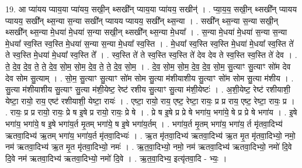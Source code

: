 \documentclass[17pt]{extarticle}
\begin{document}
19. आ प्या॑यय प्याय॒या प्या॑यय॒ सखी॒न् थ्सखी᳚न् प्याय॒या प्या॑यय॒ सखीन्॑ । . प्या॒य॒य॒ सखी॒न् थ्सखी᳚न् प्यायय प्यायय॒ सखी᳚न् थ्स॒न्या स॒न्या सखी᳚न् प्यायय प्यायय॒ सखी᳚न् थ्स॒न्या । . सखी᳚न् थ्स॒न्या स॒न्या सखी॒न् थ्सखी᳚न् थ्स॒न्या मे॒धया॑ मे॒धया॑ स॒न्या सखी॒न् थ्सखी᳚न् थ्स॒न्या मे॒धया᳚ । . स॒न्या मे॒धया॑ मे॒धया॑ स॒न्या स॒न्या मे॒धया᳚ स्व॒स्ति स्व॒स्ति मे॒धया॑ स॒न्या स॒न्या मे॒धया᳚ स्व॒स्ति । . मे॒धया᳚ स्व॒स्ति स्व॒स्ति मे॒धया॑ मे॒धया᳚ स्व॒स्ति ते॑ ते स्व॒स्ति मे॒धया॑ मे॒धया᳚ स्व॒स्ति ते᳚ । . स्व॒स्ति ते॑ ते स्व॒स्ति स्व॒स्ति ते॑ देव देव ते स्व॒स्ति स्व॒स्ति ते॑ देव । . ते॒ दे॒व॒ दे॒व॒ ते॒ ते॒ दे॒व॒ सो॒म॒ सो॒म॒ दे॒व॒ ते॒ ते॒ दे॒व॒ सो॒म॒ । . दे॒व॒ सो॒म॒ सो॒म॒ दे॒व॒ दे॒व॒ सो॒म॒ सु॒त्याꣳ सु॒त्याꣳ सो॑म देव देव सोम सु॒त्याम् । . सो॒म॒ सु॒त्याꣳ सु॒त्याꣳ सो॑म सोम सु॒त्या म॑शीयाशीय सु॒त्याꣳ सो॑म सोम सु॒त्या म॑शीय । . सु॒त्या म॑शीयाशीय सु॒त्याꣳ सु॒त्या म॑शी॒येष्ट॒ रेष्ट॑ रशीय सु॒त्याꣳ सु॒त्या म॑शी॒येष्टः॑ । . अ॒शी॒येष्ट॒ रेष्ट॑ रशीयाशी॒ येष्टा॒ रायो॒ राय॒ एष्ट॑ रशीयाशी॒ येष्टा॒ रायः॑ । . एष्टा॒ रायो॒ राय॒ एष्ट॒ रेष्टा॒ रायः॒ प्र प्र राय॒ एष्ट॒ रेष्टा॒ रायः॒ प्र । . रायः॒ प्र प्र रायो॒ रायः॒ प्रे ष इ॒षे प्र रायो॒ रायः॒ प्रे षे । . प्रे ष इ॒षे प्र प्रे षे भगा॑य॒ भगा॑ये॒ षे प्र प्रे षे भगा॑य । . इ॒षे भगा॑य॒ भगा॑ये॒ ष इ॒षे भगा॑य॒र्त मृ॒तम् भगा॑ये॒ ष इ॒षे भगा॑य॒र्तम् । . भगा॑य॒र्त मृ॒तम् भगा॑य॒ भगा॑य॒ र्त मृ॑तवा॒दिभ्य॑ ऋतवा॒दिभ्य॑ ऋ॒तम् भगा॑य॒ भगा॑य॒र्त मृ॑तवा॒दिभ्यः॑ । . ऋ॒त मृ॑तवा॒दिभ्य॑ ऋतवा॒दिभ्य॑ ऋ॒त मृ॒त मृ॑तवा॒दिभ्यो॒ नमो॒ नम॑ ऋतवा॒दिभ्य॑ ऋ॒त मृ॒त मृ॑तवा॒दिभ्यो॒ नमः॑ । . ऋ॒त॒वा॒दिभ्यो॒ नमो॒ नम॑ ऋतवा॒दिभ्य॑ ऋतवा॒दिभ्यो॒ नमो॑ दि॒वे दि॒वे नम॑ ऋतवा॒दिभ्य॑ ऋतवा॒दिभ्यो॒ नमो॑ दि॒वे । . ऋ॒त॒वा॒दिभ्य॒ इत्यृ॑तवा॒दि - भ्यः॒ । \newline
\end{document}
